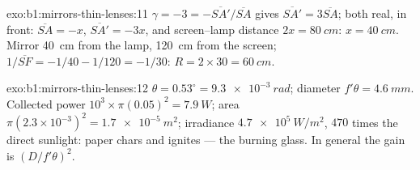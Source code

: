 \begin{solution}{exo:b1:mirrors-thin-lenses:11}
$\gamma = -3 = -\overline{SA'}/\overline{SA}$ gives $\overline{SA'} =
3\overline{SA}$; both real, in front: $\overline{SA} = -x$,
$\overline{SA'} = -3x$, and screen--lamp distance $2x = \qty{80}{cm}$:
$x = \qty{40}{cm}$. Mirror \qty{40}{cm} from the lamp, \qty{120}{cm}
from the screen; $1/\overline{SF} = -1/40 - 1/120 = -1/30$:
$R = 2 \times 30 = \qty{60}{cm}$.
\end{solution}

\begin{solution}{exo:b1:mirrors-thin-lenses:12}
$\theta = 0.53^\circ = \qty{9.3e-3}{rad}$;  diameter $f'\theta =
\qty{4.6}{mm}$. Collected power $10^3 \times \pi(0.05)^2 = \qty{7.9}{W}$;
 area $\pi(2.3\times10^{-3})^2 = \qty{1.7e-5}{m^2}$; irradiance
$\qty{4.7e5}{W/m^2}$, $470$ times the direct sunlight: paper chars and
ignites --- the burning glass. In general the gain is
$(D/f'\theta)^2$.
\end{solution}

